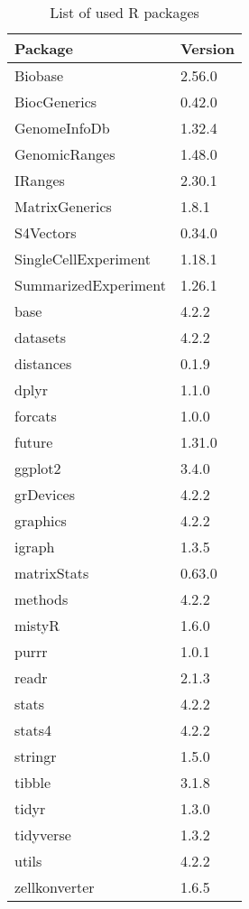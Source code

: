 \begin{table}[!h]
    \centering
    \caption{List of used R packages}
    \begin{tabular}{ll}
        \hline
        \textbf{Package} & \textbf{Version} \\ 
        \hline
        Biobase & 2.56.0 \\ 
        BiocGenerics & 0.42.0 \\ 
        GenomeInfoDb & 1.32.4 \\ 
        GenomicRanges & 1.48.0 \\ 
        IRanges & 2.30.1 \\ 
        MatrixGenerics & 1.8.1 \\ 
        S4Vectors & 0.34.0 \\ 
        SingleCellExperiment & 1.18.1 \\ 
        SummarizedExperiment & 1.26.1 \\ 
        base & 4.2.2 \\ 
        datasets & 4.2.2 \\ 
        distances & 0.1.9 \\ 
        dplyr & 1.1.0 \\ 
        forcats & 1.0.0 \\ 
        future & 1.31.0 \\ 
        ggplot2 & 3.4.0 \\ 
        grDevices & 4.2.2 \\ 
        graphics & 4.2.2 \\ 
        igraph & 1.3.5 \\ 
        matrixStats & 0.63.0 \\ 
        methods & 4.2.2 \\ 
        mistyR & 1.6.0 \\ 
        purrr & 1.0.1 \\ 
        readr & 2.1.3 \\ 
        stats & 4.2.2 \\ 
        stats4 & 4.2.2 \\ 
        stringr & 1.5.0 \\ 
        tibble & 3.1.8 \\ 
        tidyr & 1.3.0 \\ 
        tidyverse & 1.3.2 \\ 
        utils & 4.2.2 \\ 
        zellkonverter & 1.6.5 \\ 
    \end{tabular}
    \label{tab:R}
\end{table}

